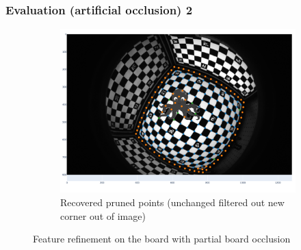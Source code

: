 \documentclass{beamer}
\begin{document}
\begin{frame}
	\frametitle{Evaluation (artificial occlusion) 2}
	\begin{figure}
		\begin{subfigure}[h]{\linewidth}
			\centering
			\includegraphics[width=0.7\linewidth]{refined_overlayed_corners.png}
			\caption{Recovered pruned points
				(\textcolor[HTML]{1f77b4}{unchanged}
				\textcolor[HTML]{ff7f0e}{filtered out}
				\textcolor[HTML]{2ca02c}{new corner}
				\textcolor[HTML]{d62728}{out of image})}
		\end{subfigure}
		\hfill
		\caption{Feature refinement on the board with partial board occlusion}
	\end{figure}

\end{frame}
\end{document}
